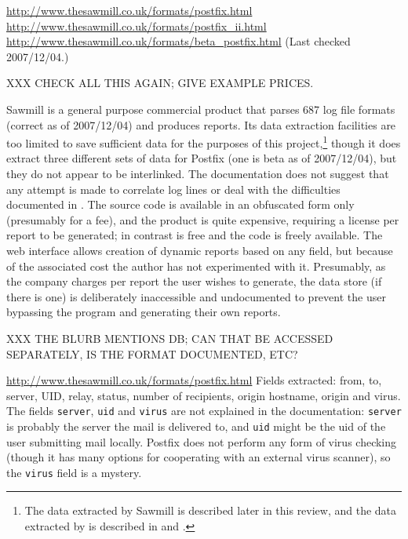 \noindent{}\url{http://www.thesawmill.co.uk/formats/postfix.html} \newline{}
\url{http://www.thesawmill.co.uk/formats/postfix_ii.html} \newline{}
\url{http://www.thesawmill.co.uk/formats/beta_postfix.html} \newline{}
(Last checked 2007/12/04.)

XXX CHECK ALL THIS AGAIN\@; GIVE EXAMPLE PRICES\@.

Sawmill is a general purpose commercial product that parses 687 log file
formats (correct as of 2007/12/04) and produces reports.  Its data
extraction facilities are too limited to save sufficient data for the
purposes of this project,\footnote{The data extracted by Sawmill is
described later in this review, and the data extracted by \PLP{} is
described in  and .} though it does extract three different sets of data for Postfix
(one is beta as of 2007/12/04), but they do not appear to be interlinked.
The documentation does not suggest that any attempt is made to correlate
log lines or deal with the difficulties documented in
.  The source code is available in an obfuscated
form only (presumably for a fee), and the product is quite expensive,
requiring a license per report to be generated; in contrast \parsername{}
is free and the code is freely available.  The web interface allows
creation of dynamic reports based on any field, but because of the
associated cost the author has not experimented with it.  Presumably, as
the company charges per report the user wishes to generate, the data store
(if there is one) is deliberately inaccessible and undocumented to prevent
the user bypassing the program and generating their own reports.

XXX THE BLURB MENTIONS \SQL{} DB\@; CAN THAT BE ACCESSED SEPARATELY, IS THE
FORMAT DOCUMENTED, ETC\@?

\url{http://www.thesawmill.co.uk/formats/postfix.html} \newline{} Fields
extracted: from, to, server, UID, relay, status, number of recipients,
origin hostname, origin \IP{} and virus.  The fields \texttt{server},
\texttt{uid} and \texttt{virus} are not explained in the documentation:
\texttt{server} is probably the server the mail is delivered to, and
\texttt{uid} might be the uid of the user submitting mail locally.  Postfix
does not perform any form of virus checking (though it has many options for
cooperating with an external virus scanner), so the \texttt{virus} field is
a mystery.

